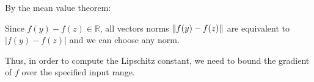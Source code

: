 By the mean value theorem:




Since $f(y) - f(z) \in \mathbb{R}$, all vectors norms $\lVert f(y) - f(z) \rVert$
are equivalent to $|f(y) - f(z)|$ and we can choose any norm.


Thus, in order to compute the Lipschitz constant, we need to bound the gradient of $f$
over the specified input range.
